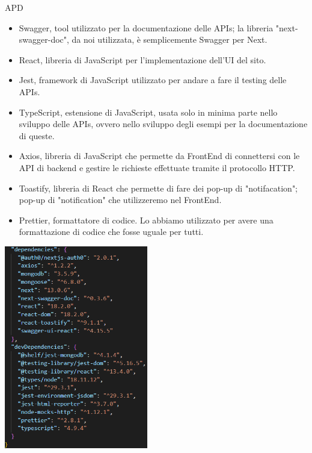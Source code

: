 \begin{listaPersonale} {APD}
\begin{itemize}
        \item Swagger, tool utilizzato per la documentazione delle APIs; la libreria "next-swagger-doc", da noi utilizzata, è semplicemente Swagger per Next.
        \item React, libreria di JavaScript per l'implementazione dell'UI del sito.
        \item Jest, framework di JavaScript utilizzato per andare a fare il testing delle APIs.

        \item TypeScript, estensione di JavaScript, usata solo in minima parte nello sviluppo delle APIs, ovvero nello sviluppo degli esempi per la documentazione di queste.
        \item Axios, libreria di JavaScript che permette da FrontEnd di connettersi con le API di backend e gestire le richieste effettuate tramite il protocollo HTTP.
        \item Toastify, libreria di React che permette di fare dei pop-up di "notifacation"; pop-up di "notification" che utilizzeremo nel FrontEnd.
        \item Prettier, formattatore di codice. Lo abbiamo utilizzato per avere una formattazione di codice che fosse uguale per tutti.
    \end{itemize}
    \begin{center}
        \includegraphics[width=0.47\textwidth, height=0.45\textheight]{img/png/package_json.png}

\end{center}
\end{listaPersonale}
